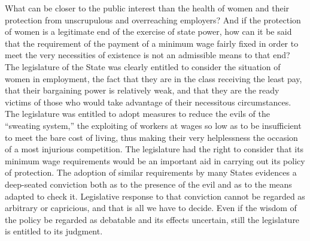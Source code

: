\documentclass[
  letterpaper,
  11pt,
  DIV=9,
  openright]{scrbook}
\begin{document}
What can be closer to the public interest than the health of women and
their protection from unscrupulous and overreaching employers? And if
the protection of women is a legitimate end of the exercise of state
power, how can it be said that the requirement of the payment of a
minimum wage fairly fixed in order to meet the very necessities of
existence is not an admissible means to that end? The legislature of the
State was clearly entitled to consider the situation of women in
employment, the fact that they are in the class receiving the least pay,
that their bargaining power is relatively weak, and that they are the
ready victims of those who would take advantage of their necessitous
circumstances. The legislature was entitled to adopt measures to reduce
the evils of the ``sweating system,'' the exploiting of workers at wages
so low as to be insufficient to meet the bare cost of living, thus
making their very helplessness the occasion of a most injurious
competition. The legislature had the right to consider that its minimum
wage requirements would be an important aid in carrying out its policy
of protection. The adoption of similar requirements by many States
evidences a deep-seated conviction both as to the presence of the evil
and as to the means adapted to check it. Legislative response to that
conviction cannot be regarded as arbitrary or capricious, and that is
all we have to decide. Even if the wisdom of the policy be regarded as
debatable and its effects uncertain, still the legislature is entitled
to its judgment.
\end{document}
